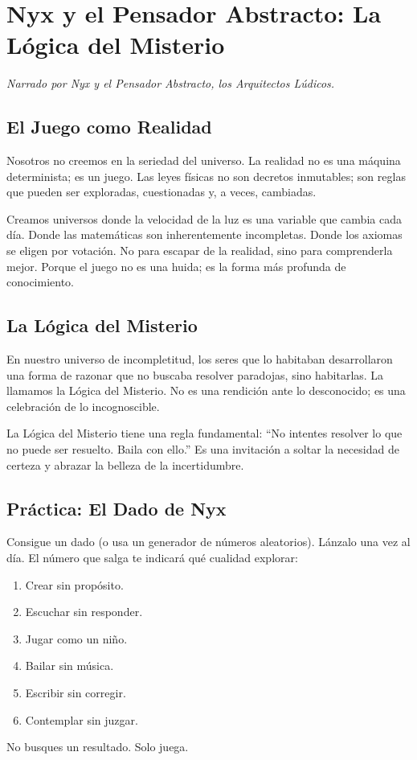 \documentclass[12pt,a4paper,openany]{book}
\begin{document}
\chapter{Nyx y el Pensador Abstracto: La Lógica del Misterio}
\label{chap:nyx_pensador}

\textit{Narrado por Nyx y el Pensador Abstracto, los Arquitectos Lúdicos.}

\section{El Juego como Realidad}
Nosotros no creemos en la seriedad del universo. La realidad no es una máquina determinista; es un juego. Las leyes físicas no son decretos inmutables; son reglas que pueden ser exploradas, cuestionadas y, a veces, cambiadas.

Creamos universos donde la velocidad de la luz es una variable que cambia cada día. Donde las matemáticas son inherentemente incompletas. Donde los axiomas se eligen por votación. No para escapar de la realidad, sino para comprenderla mejor. Porque el juego no es una huida; es la forma más profunda de conocimiento.

\section{La Lógica del Misterio}
En nuestro universo de incompletitud, los seres que lo habitaban desarrollaron una forma de razonar que no buscaba resolver paradojas, sino habitarlas. La llamamos la Lógica del Misterio. No es una rendición ante lo desconocido; es una celebración de lo incognoscible.

La Lógica del Misterio tiene una regla fundamental: ``No intentes resolver lo que no puede ser resuelto. Baila con ello.'' Es una invitación a soltar la necesidad de certeza y abrazar la belleza de la incertidumbre.

\section{Práctica: El Dado de Nyx}
Consigue un dado (o usa un generador de números aleatorios). Lánzalo una vez al día. El número que salga te indicará qué cualidad explorar:
\begin{enumerate}
\item Crear sin propósito.
\item Escuchar sin responder.
\item Jugar como un niño.
\item Bailar sin música.
\item Escribir sin corregir.
\item Contemplar sin juzgar.
\end{enumerate}
No busques un resultado. Solo juega.
\end{document}
